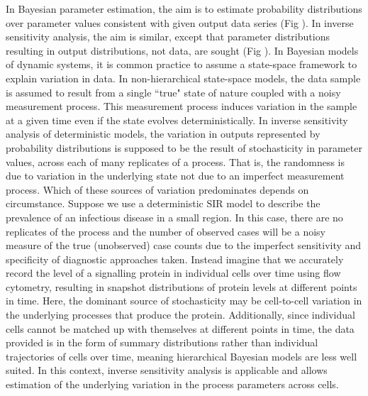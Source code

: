 \documentclass[10pt,letterpaper]{article}
\begin{document}
In Bayesian parameter estimation, the aim is to estimate probability distributions over parameter values consistent with given output data series (Fig ). In inverse sensitivity analysis, the aim is similar, except that parameter distributions resulting in output distributions, not data, are sought (Fig ). In Bayesian models of dynamic systems, it is common practice to assume a state-space framework to explain variation in data. In non-hierarchical state-space models, the data sample is assumed to result from a single ``true" state of nature coupled with a noisy measurement process. This measurement process induces variation in the sample at a given time even if the state evolves deterministically. In inverse sensitivity analysis of deterministic models, the variation in outputs represented by probability distributions is supposed to be the result of stochasticity in parameter values, across each of many replicates of a process. That is, the randomness is due to variation in the underlying state not due to an imperfect measurement process. Which of these sources of variation predominates depends on circumstance. Suppose we use a deterministic SIR model to describe the prevalence of an infectious disease in a small region. In this case, there are no replicates of the process and the number of observed cases will be a noisy measure of the true (unobserved) case counts due to the imperfect sensitivity and specificity of diagnostic approaches taken. Instead imagine that we accurately record the level of a signalling protein in individual cells over time using flow cytometry, resulting in snapshot distributions of protein levels at different points in time. Here, the dominant source of stochasticity may be cell-to-cell variation in the underlying processes that produce the protein. Additionally, since individual cells cannot be matched up with themselves at different points in time, the data provided is in the form of summary distributions rather than individual trajectories of cells over time, meaning hierarchical Bayesian models are less well suited. In this context, inverse sensitivity analysis is applicable and allows estimation of the underlying variation in the process parameters across cells.
\end{document}
